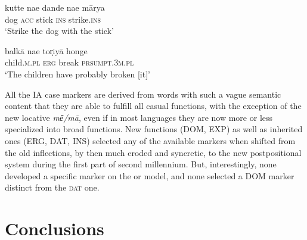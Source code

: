 \documentclass[output=paper]{LSP/langsci}
\begin{document}
\ex \label{10-mo-ex:59b}
\gll kutte nae dande nae mārya\\
 dog \textsc{acc} stick \textsc{ins} strike.\textsc{ins}\\
 \glt ‘Strike the dog with the stick’ \citep{Singh1970Descriptive}

\ex \label{10-mo-ex:59c}
\gll balkā nae tor̩iyā honge\\
 child.\textsc{m.pl} \textsc{erg} break \textsc{prsumpt.3m.pl}\\
\glt ‘The children have probably broken [it]’ \citep{Singh1970Descriptive}
 \z
 \z

All the IA case markers are derived from words with such a vague semantic content that they are able to fulfill all casual functions, with the exception of the new locative \textit{me͂/mā}, even if in most languages they are now more or less specialized into broad functions. New functions (DOM, EXP) as well as inherited ones (ERG, DAT, INS) selected any of the available markers when  shifted from the old inflections, by then much eroded and syncretic, to the new postpositional system during the first part of second millennium. But, interestingly, none developed a specific marker on the  or  model, and none selected a DOM marker distinct from the \textsc{dat} one.

\section{Conclusions}
\end{document}
